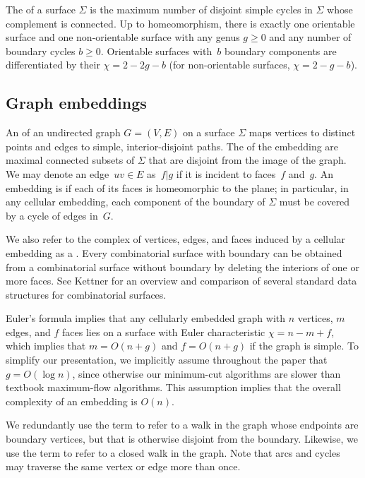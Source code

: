 \documentclass[letterpaper,review]{siamart190516}
\def\anote#1{\color{purple}Amir: #1 \color{black}}
\def\jnote#1{\textcolor{orange}{Jeff: #1}}
\begin{document}
The  of a surface $\Sigma$ is the maximum number of disjoint simple cycles in $\Sigma$ whose complement is connected.
 Up to homeomorphism,
there is exactly one orientable surface and one non-orientable surface with any genus $g\ge 0$ and any number of
boundary cycles $b\ge 0$.
Orientable surfaces with~$b$ boundary components are differentiated by their  ${\chi = 2 - 2g - b}$ (for non-orientable surfaces, ${\chi = 2 - g - b}$).


\subsection{Graph embeddings}
\label{SS:embeddings}

An  of an undirected graph $G=(V,E)$ on a surface $\Sigma$ maps vertices to distinct points and edges to simple, interior-disjoint paths.  The  of the embedding are maximal connected subsets of $\Sigma$ that are disjoint from the image of the graph.
We may denote an edge~$uv \in E$ as~$f | g$ if it is incident to faces~$f$ and~$g$.
An embedding is  if each of its faces is homeomorphic to the plane; in particular, in any cellular embedding, each component of the boundary of $\Sigma$ must be covered by a cycle of edges in~$G$.  

We also refer to the complex of vertices, edges, and faces induced by a cellular embedding as a .  Every combinatorial surface with boundary can be obtained from a combinatorial surface without boundary by deleting the interiors of one or more faces.  See Kettner \cite{k-ugpdd-99} for an overview and comparison of several standard data structures for combinatorial surfaces. 

Euler's formula implies that any cellularly embedded graph with $n$ vertices, $m$ edges, and $f$ faces lies on a surface with Euler characteristic $\chi = n-m+f$, which implies that $m = O(n+g)$ and $f=O(n+g)$ if the graph is simple.
To simplify our presentation, we implicitly assume throughout the paper that $g = O(\log n)$, since otherwise our minimum-cut algorithms are slower than textbook maximum-flow algorithms.  This assumption implies that the overall complexity of an embedding is $O(n)$.

We redundantly use the term  to refer to a walk in the graph whose endpoints are boundary vertices, but that is otherwise disjoint from the boundary.  Likewise, we use the term  to refer to a closed walk in the graph.  Note that arcs and cycles may traverse the same vertex or edge more than once.
\end{document}
